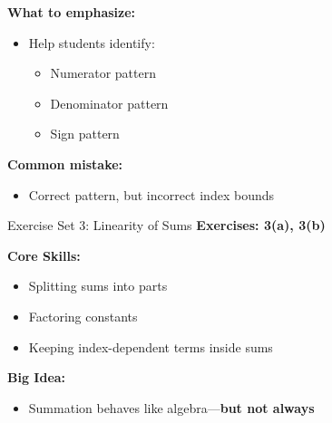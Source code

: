 \documentclass[dvipsnames]{beamer}
\begin{document}
\begin{frame}
\textbf{What to emphasize:}
\begin{itemize}
\item Help students identify:
\begin{itemize}
\item Numerator pattern
\item Denominator pattern
\item Sign pattern
\end{itemize}
\end{itemize}

\vspace{1em}

\textbf{Common mistake:}
\begin{itemize}
\item Correct pattern, but incorrect index bounds
\end{itemize}
\end{frame}


\begin{frame}{Exercise Set 3: Linearity of Sums}
\textbf{Exercises: 3(a), 3(b)}

\vspace{1em}

\textbf{Core Skills:}
\begin{itemize}
\item Splitting sums into parts
\item Factoring constants
\item Keeping index-dependent terms inside sums
\end{itemize}

\vspace{1em}

\textbf{Big Idea:}
\begin{itemize}
\item Summation behaves like algebra—\textbf{but not always}
\end{itemize}
\end{frame}

\end{document}
